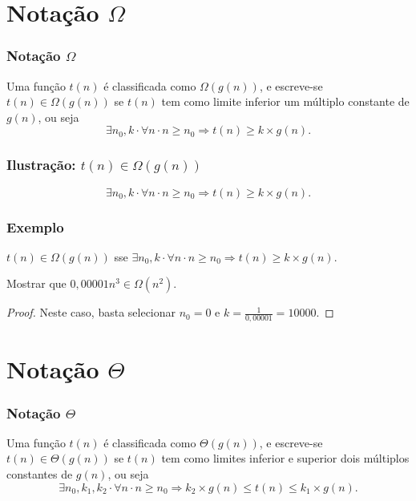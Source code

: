 \documentclass{beamer}
\begin{document}
\section{Notação \texorpdfstring{$\Omega$}{Big Omega}}

\begin{frame}
\frametitle{Notação $\Omega$}
\begin{definition}
Uma função $t(n)$ é classificada como $\Omega(g(n))$, e escreve-se $t(n) \in \Omega(g(n))$ se $t(n)$ tem como limite inferior um múltiplo constante de $g(n)$, ou seja
$$
\exists n_0, k \cdot \forall n \cdot n \ge n_0 \Rightarrow t(n) \ge k \times g(n).
$$
\end{definition}
\end{frame}

\begin{frame}
  \frametitle{Ilustração: $t(n) \in \Omega(g(n))$}
  \begin{center}
    
  \end{center}
$$
\exists n_0, k \cdot \forall n \cdot n \ge n_0 \Rightarrow t(n) \ge k \times g(n).
$$
\end{frame}

\begin{frame}
\frametitle{Exemplo}

\begin{definition}
$t(n) \in \Omega(g(n))$ sse $\exists n_0, k \cdot \forall n \cdot n \ge n_0 \Rightarrow t(n) \ge k \times g(n)$.
\end{definition}

\begin{example}
Mostrar que $0,00001 n^3 \in \Omega(n^2)$.
\end{example}

\begin{proof}
  Neste caso, basta selecionar $n_0 = 0$ e $k = \frac{1}{0,00001} = 10000$.
\end{proof}
\end{frame}


\section{Notação \texorpdfstring{$\Theta$}{Big Theta}}

\begin{frame}
\frametitle{Notação $\Theta$}
\begin{definition}
Uma função $t(n)$ é classificada como $\Theta(g(n))$, e escreve-se $t(n) \in \Theta(g(n))$ se $t(n)$ tem como limites inferior e superior dois múltiplos constantes de $g(n)$, ou seja
$$
\exists n_0, k_1, k_2 \cdot \forall n \cdot n \ge n_0 \Rightarrow k_2 \times g(n) \le t(n) \le k_1 \times g(n).
$$
\end{definition}
\end{frame}
\end{document}
